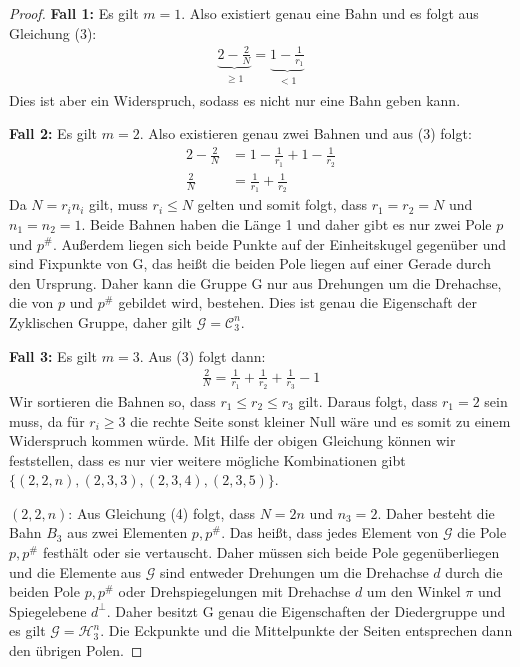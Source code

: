\begin{proof}
	\textbf{Fall 1:} Es gilt $m=1$. Also existiert genau eine Bahn und es folgt aus Gleichung (3):
	\begin{align*}
	\underbrace{2-\frac{2}{N}}_{\substack{\geq 1}} = \underbrace{1-\frac{1}{r_1}}_{\substack{<1}}
	\end{align*}
	Dies ist aber ein Widerspruch, sodass es nicht nur eine Bahn geben kann.
	
	\textbf{Fall 2:} Es gilt $m=2$. Also existieren genau zwei Bahnen und aus (3) folgt:
	\begin{align*}
	2-\frac{2}{N} &= 1-\frac{1}{r_1} + 1-\frac{1}{r_2} \\
	\frac{2}{N} &= \frac{1}{r_1} + \frac{1}{r_2}
	\end{align*}
	Da $N=r_i n_i$ gilt, muss $r_i \leq N$ gelten und somit folgt, dass $r_1 = r_2 = N$ und $n_1 = n_2 = 1$. Beide Bahnen haben die Länge 1 und daher gibt es nur zwei Pole $p$ und $p^{\#}$. Außerdem liegen sich beide Punkte auf der Einheitskugel gegenüber und sind Fixpunkte von G, das heißt die beiden Pole liegen auf einer Gerade durch den Ursprung. Daher kann die Gruppe G nur aus Drehungen um die Drehachse, die von $p$ und $p^{\#}$ gebildet wird, bestehen. Dies ist genau die Eigenschaft der Zyklischen Gruppe, daher gilt $\mathcal{G}=\mathcal{C}_3^n$.
	
	\textbf{Fall 3:} Es gilt $m=3$. Aus (3) folgt dann:
	\begin{align}
	\frac{2}{N} = \frac{1}{r_1} + \frac{1}{r_2} + \frac{1}{r_3} - 1
	\end{align}
	Wir sortieren die Bahnen so, dass $r_1 \leq r_2 \leq r_3$ gilt. Daraus folgt, dass $r_1 = 2$ sein muss, da für $r_i \geq 3$ die rechte Seite sonst kleiner Null wäre und es somit zu einem Widerspruch kommen würde. Mit Hilfe der obigen Gleichung können wir feststellen, dass es nur vier weitere mögliche Kombinationen gibt $\{(2,2,n),(2,3,3),(2,3,4),(2,3,5)\}$.
	
	
	$(2,2,n)$: Aus Gleichung (4) folgt, dass $N = 2n$ und $n_3=2$. Daher besteht die Bahn $B_3$ aus zwei Elementen $p, p^{\#}$. Das heißt, dass jedes Element von $\mathcal{G}$ die Pole $p,p^{\#}$ festhält oder sie vertauscht. Daher müssen sich beide Pole gegenüberliegen und die Elemente aus $\mathcal{G}$ sind entweder Drehungen um die Drehachse $d$ durch die beiden Pole $p,p^{\#}$ oder Drehspiegelungen mit Drehachse $d$ um den Winkel $\pi$ und Spiegelebene $d^{\perp}$. Daher besitzt G genau die Eigenschaften der Diedergruppe und es gilt $\mathcal{G} = \mathcal{H}_3^n$. Die Eckpunkte und die Mittelpunkte der Seiten entsprechen dann den übrigen Polen. 
	

\end{proof}
